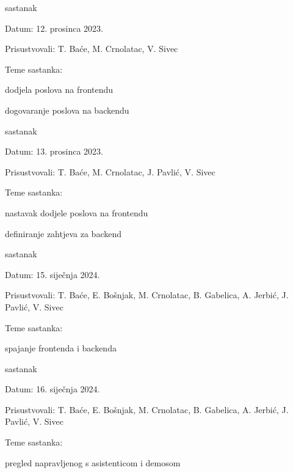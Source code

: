 \begin{packed_enum}
			\item  sastanak
			\item[] \begin{packed_item}
				\item Datum: 12. prosinca 2023.
				\item Prisustvovali: T. Baće, M. Crnolatac, V. Sivec
				\item Teme sastanka:
				\begin{packed_item}
					\item  dodjela poslova na frontendu
					\item  dogovaranje poslova na backendu
				\end{packed_item}
			\end{packed_item}
			
			\item  sastanak
			\item[] \begin{packed_item}
				\item Datum: 13. prosinca 2023.
				\item Prisustvovali: T. Baće, M. Crnolatac, J. Pavlić, V. Sivec
				\item Teme sastanka:
				\begin{packed_item}
					\item  nastavak dodjele poslova na frontendu
					\item  definiranje zahtjeva za backend
				\end{packed_item}
			\end{packed_item}
			
			\item  sastanak
			\item[] \begin{packed_item}
				\item Datum: 15. siječnja 2024.
				\item Prisustvovali: T. Baće, E. Bošnjak, M. Crnolatac, B. Gabelica, A. Jerbić, J. Pavlić, V. Sivec
				\item Teme sastanka:
				\begin{packed_item}
					\item  spajanje frontenda i backenda
				\end{packed_item}
			\end{packed_item}
			
			\item  sastanak
			\item[] \begin{packed_item}
				\item Datum: 16. siječnja 2024.
				\item Prisustvovali: T. Baće, E. Bošnjak, M. Crnolatac, B. Gabelica, A. Jerbić, J. Pavlić, V. Sivec
				\item Teme sastanka:
				\begin{packed_item}
					\item  pregled napravljenog s asistenticom i demosom
				\end{packed_item}
			\end{packed_item}
			

\end{packed_enum}
